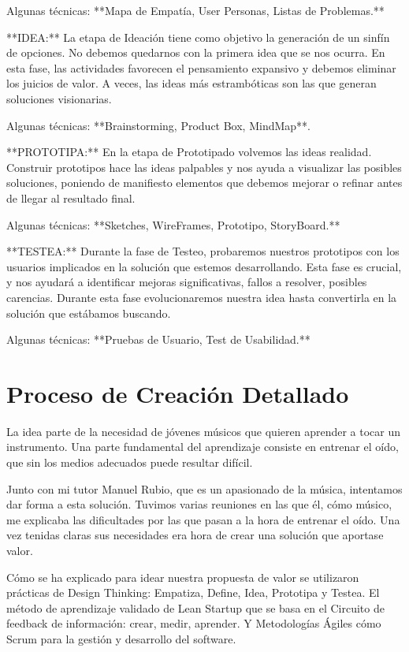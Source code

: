 \documentclass[12pt,twoside,titlepage]{report}
\begin{document}
Algunas técnicas: **Mapa de Empatía, User Personas, Listas de Problemas.**

**IDEA:** La etapa de Ideación tiene como objetivo la generación de un sinfín de opciones. No debemos quedarnos con la primera idea que se nos ocurra. En esta fase, las actividades favorecen el pensamiento expansivo y debemos eliminar los juicios de valor. A veces, las ideas más estrambóticas son las que generan soluciones visionarias.

Algunas técnicas: **Brainstorming, Product Box, MindMap**.

**PROTOTIPA:** En la etapa de Prototipado volvemos las ideas realidad. Construir prototipos hace las ideas palpables y nos ayuda a visualizar las posibles soluciones, poniendo de manifiesto elementos que debemos mejorar o refinar antes de llegar al resultado final.

Algunas técnicas: **Sketches, WireFrames, Prototipo, StoryBoard.**

**TESTEA:** Durante la fase de Testeo, probaremos nuestros prototipos con los usuarios implicados en la solución que estemos desarrollando. Esta fase es crucial, y nos ayudará a identificar mejoras significativas, fallos a resolver, posibles carencias. Durante esta fase evolucionaremos nuestra idea hasta convertirla en la solución que estábamos buscando.

Algunas técnicas: **Pruebas de Usuario, Test de Usabilidad.**

\section{Proceso de Creación Detallado}

La idea parte de la necesidad de jóvenes músicos que quieren aprender a tocar un instrumento. Una parte fundamental del aprendizaje consiste en entrenar el oído, que sin los medios adecuados puede resultar difícil.

Junto con mi tutor Manuel Rubio, que es un apasionado de la música, intentamos dar forma a esta solución. Tuvimos varias reuniones en las que él, cómo músico, me explicaba las dificultades por las que pasan a la hora de entrenar el oído. Una vez tenidas claras sus necesidades era hora de crear una solución que aportase valor.

Cómo se ha explicado para idear nuestra propuesta de valor se utilizaron prácticas de Design Thinking: Empatiza, Define, Idea, Prototipa y Testea. El método de aprendizaje validado de Lean Startup que se basa en el Circuito de feedback de información: crear, medir, aprender. Y Metodologías Ágiles cómo Scrum para la gestión y desarrollo del software.
\end{document}
